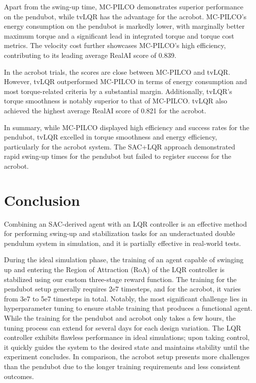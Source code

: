 Apart from the swing-up time, MC-PILCO demonstrates superior performance on the pendubot, while tvLQR has the advantage for the acrobot. MC-PILCO's energy consumption on the pendubot is markedly lower, with marginally better maximum torque and a significant lead in integrated torque and torque cost metrics. The velocity cost further showcases MC-PILCO's high efficiency, contributing to its leading average RealAI score of 0.839.

In the acrobot trials, the scores are close between MC-PILCO and tvLQR. However, tvLQR outperformed MC-PILCO in terms of energy consumption and most torque-related criteria by a substantial margin. Additionally, tvLQR's torque smoothness is notably superior to that of MC-PILCO. tvLQR also achieved the highest average RealAI score of 0.821 for the acrobot.

In summary, while MC-PILCO displayed high efficiency and success rates for the pendubot, tvLQR excelled in torque smoothness and energy efficiency, particularly for the acrobot system. The SAC+LQR approach demonstrated rapid swing-up times for the pendubot but failed to register success for the acrobot.

\section{Conclusion}
Combining an SAC-derived agent with an LQR controller is an effective method for performing swing-up and stabilization tasks for an underactuated double pendulum system in simulation, and it is partially effective in real-world tests.

During the ideal simulation phase, the training of an agent capable of swinging up and entering the Region of Attraction (RoA) of the LQR controller is stabilized using our custom three-stage reward function. The training for the pendubot setup generally requires 2e7 timesteps, and for the acrobot, it varies from 3e7 to 5e7 timesteps in total. Notably, the most significant challenge lies in hyperparameter tuning to ensure stable training that produces a functional agent. While the training for the pendubot and acrobot only takes a few hours, the tuning process can extend for several days for each design variation. The LQR controller exhibits flawless performance in ideal simulations; upon taking control, it quickly guides the system to the desired state and maintains stability until the experiment concludes. In comparison, the acrobot setup presents more challenges than the pendubot due to the longer training requirements and less consistent outcomes.

